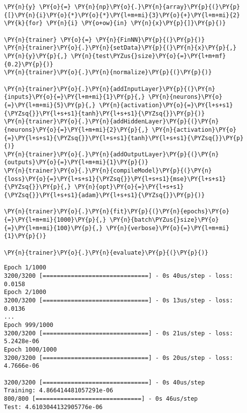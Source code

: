\begin{Answer}
\begin{codebox}[size=fbox, boxrule=1pt,colback=cellbackground, colframe=cellborder]
\begin{Verbatim}[commandchars=\\\{\}]
\PY{n}{y} \PY{o}{=} \PY{n}{np}\PY{o}{.}\PY{n}{array}\PY{p}{(}\PY{p}{[}\PY{n}{i}\PY{o}{*}\PY{o}{*}\PY{l+m+mi}{3}\PY{o}{+}\PY{l+m+mi}{2} \PY{k}{for} \PY{n}{i} \PY{o+ow}{in} \PY{n}{x}\PY{p}{]}\PY{p}{)}
	
\PY{n}{trainer} \PY{o}{=} \PY{n}{FinNN}\PY{p}{(}\PY{p}{)}
\PY{n}{trainer}\PY{o}{.}\PY{n}{setData}\PY{p}{(}\PY{n}{x}\PY{p}{,} \PY{n}{y}\PY{p}{,} \PY{n}{test\PYZus{}size}\PY{o}{=}\PY{l+m+mf}{0.2}\PY{p}{)}
\PY{n}{trainer}\PY{o}{.}\PY{n}{normalize}\PY{p}{(}\PY{p}{)}
	
\PY{n}{trainer}\PY{o}{.}\PY{n}{addInputLayer}\PY{p}{(}\PY{n}{inputs}\PY{o}{=}\PY{l+m+mi}{1}\PY{p}{,} \PY{n}{neurons}\PY{o}{=}\PY{l+m+mi}{5}\PY{p}{,} \PY{n}{activation}\PY{o}{=}\PY{l+s+s1}{\PYZsq{}}\PY{l+s+s1}{tanh}\PY{l+s+s1}{\PYZsq{}}\PY{p}{)}
\PY{n}{trainer}\PY{o}{.}\PY{n}{addHiddenLayer}\PY{p}{(}\PY{n}{neurons}\PY{o}{=}\PY{l+m+mi}{2}\PY{p}{,} \PY{n}{activation}\PY{o}{=}\PY{l+s+s1}{\PYZsq{}}\PY{l+s+s1}{tanh}\PY{l+s+s1}{\PYZsq{}}\PY{p}{)}
\PY{n}{trainer}\PY{o}{.}\PY{n}{addOutputLayer}\PY{p}{(}\PY{n}{outputs}\PY{o}{=}\PY{l+m+mi}{1}\PY{p}{)}
\PY{n}{trainer}\PY{o}{.}\PY{n}{compileModel}\PY{p}{(}\PY{n}{loss}\PY{o}{=}\PY{l+s+s1}{\PYZsq{}}\PY{l+s+s1}{mse}\PY{l+s+s1}{\PYZsq{}}\PY{p}{,} \PY{n}{opt}\PY{o}{=}\PY{l+s+s1}{\PYZsq{}}\PY{l+s+s1}{adam}\PY{l+s+s1}{\PYZsq{}}\PY{p}{)}
	
\PY{n}{trainer}\PY{o}{.}\PY{n}{fit}\PY{p}{(}\PY{n}{epochs}\PY{o}{=}\PY{l+m+mi}{1000}\PY{p}{,} \PY{n}{batch\PYZus{}size}\PY{o}{=}\PY{l+m+mi}{100}\PY{p}{,} \PY{n}{verbose}\PY{o}{=}\PY{l+m+mi}{1}\PY{p}{)}
	
\PY{n}{trainer}\PY{o}{.}\PY{n}{evaluate}\PY{p}{(}\PY{p}{)}
\end{Verbatim}
\end{codebox}

\begin{codebox}[size=fbox, boxrule=1pt,colback=cellbackground, colframe=cellborder]
\begin{Verbatim}[commandchars=\\\{\}]
Epoch 1/1000
3200/3200 [==============================] - 0s 40us/step - loss: 0.0158
Epoch 2/1000
3200/3200 [==============================] - 0s 13us/step - loss: 0.0136
...
Epoch 999/1000
3200/3200 [==============================] - 0s 21us/step - loss: 5.2428e-06
Epoch 1000/1000
3200/3200 [==============================] - 0s 20us/step - loss: 4.7666e-06

3200/3200 [==============================] - 0s 40us/step
Training: 4.866414481057291e-06
800/800 [==============================] - 0s 46us/step
Test: 4.6103044132905776e-06
\end{Verbatim}
\end{codebox}


\end{Answer}
